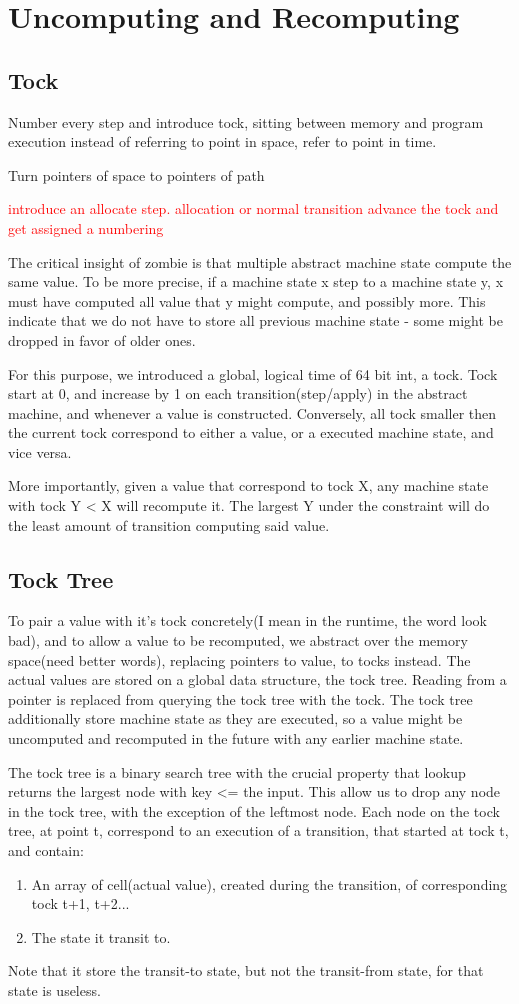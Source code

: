 \documentclass[acmsmall]{acmart}
\newcommand\todo[1]{\textcolor{red}{#1}}
\begin{document}
	\section{Uncomputing and Recomputing}
	\subsection{Tock}
	Number every step and introduce tock, sitting between memory and program execution
	instead of referring to point in space, refer to point in time.

	Turn pointers of space to pointers of path
	
	\todo{introduce an allocate step. allocation or normal transition advance the tock and get assigned a numbering}
	
	The critical insight of zombie is that multiple abstract machine state compute the same value. To be more precise, if a machine state x step to a machine state y, x must have computed all value that y might compute, and possibly more. This indicate that we do not have to store all previous machine state - some might be dropped in favor of older ones.
	
	For this purpose, we introduced a global, logical time of 64 bit int, a tock. Tock start at 0, and increase by 1 on each transition(step/apply) in the abstract machine, and whenever a value is constructed. Conversely, all tock smaller then the current tock correspond to either a value, or a executed machine state, and vice versa.
	
	More importantly, given a value that correspond to tock X, any machine state with tock Y < X will recompute it. The largest Y under the constraint will do the least amount of transition computing said value.
	\subsection{Tock Tree}
	To pair a value with it's tock concretely(I mean in the runtime, the word look bad), and to allow a value to be recomputed, we abstract over the memory space(need better words), replacing pointers to value, to tocks instead. The actual values are stored on a global data structure, the tock tree. Reading from a pointer is replaced from querying the tock tree with the tock. The tock tree additionally store machine state as they are executed, so a value might be uncomputed and recomputed in the future with any earlier machine state.
	
	The tock tree is a binary search tree with the crucial property that lookup returns the largest node with key <= the input. This allow us to drop any node in the tock tree, with the exception of the leftmost node. Each node on the tock tree, at point t, correspond to an execution of a transition, that started at tock t, and contain:
	\begin{enumerate}
		\item An array of cell(actual value), created during the transition, of corresponding tock t+1, t+2...
		\item The state it transit to.
	\end{enumerate} 
	Note that it store the transit-to state, but not the transit-from state, for that state is useless.
\end{document}
